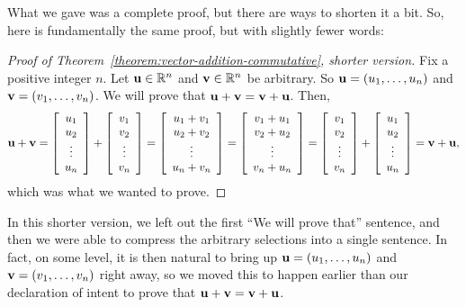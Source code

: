 \documentclass{book}
\theoremstyle{ekimcustom}
\begin{document}
What we gave was a complete proof, but there are ways to shorten it a bit. So, here is fundamentally the same proof, but with slightly fewer words:
\begin{proof}[Proof of Theorem~\ref{theorem:vector-addition-commutative}, shorter version]
Fix a positive integer $n$. Let ${\bf u} \in \mathbb{R}^n$ and ${\bf v} \in \mathbb{R}^n$ be arbitrary. So ${\bf u} = (u_1,\dots,u_n)$ and ${\bf v} = (v_1,\dots,v_n)$. We will prove that ${\bf u}+{\bf v} = {\bf v} + {\bf u}$.  Then,
\[ {\bf u} + {\bf v}
= 
\left[ \begin{array}{c}u_1\\u_2\\\vdots\\u_n\end{array} \right]
+
\left[ \begin{array}{c}v_1\\v_2\\\vdots\\v_n\end{array} \right]
=
\left[ \begin{array}{c}u_1+v_1\\u_2+v_2\\\vdots\\u_n+v_n\end{array} \right]
=
\left[ \begin{array}{c}v_1+u_1\\v_2+u_2\\\vdots\\v_n+u_n\end{array} \right]
=
\left[ \begin{array}{c}v_1\\v_2\\\vdots\\v_n\end{array} \right]
+
\left[ \begin{array}{c}u_1\\u_2\\\vdots\\u_n\end{array} \right]
=
{\bf v} + {\bf u},\]
which was what we wanted to prove.
\end{proof}
In this shorter version, we left out the first ``We will prove that'' sentence, and then we were able to compress the arbitrary selections into a single sentence. In fact, on some level, it is then natural to bring up ${\bf u} = (u_1,\dots,u_n)$ and ${\bf v} = (v_1,\dots,v_n)$ right away, so we moved this to happen earlier than our declaration of intent to prove that ${\bf u}+{\bf v} = {\bf v} + {\bf u}$.
\end{document}
